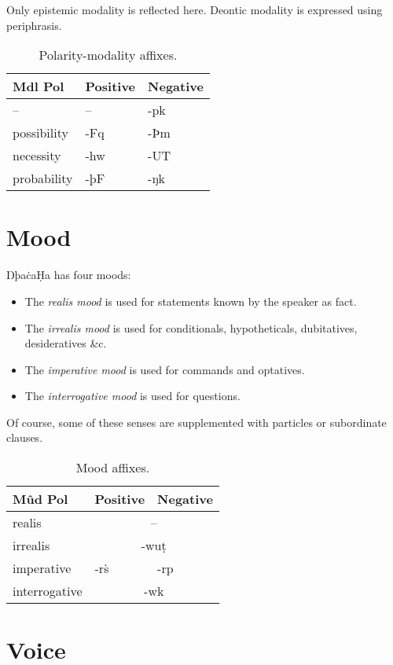 \documentclass{book}
\newcommand{\lname}{ŊþaċaḤa}
\begin{document}
Only epistemic modality is reflected here. Deontic modality is expressed using periphrasis.

\begin{table}[h!]
  \caption{Polarity-modality affixes.}
  \centering
  \begin{tabular}{l|ll}
    Mdl \bs{} Pol & Positive & Negative \\
    \hline
    -- & -- & -pk \\
    possibility & -Fq & -Þm \\
    necessity & -hw & -UT \\
    probability & -þF & -ŋk \\
  \end{tabular}
\end{table}

\section{Mood}

\lname{} has four moods:

\begin{itemize}
  \item The \emph{realis mood} is used for statements known by the speaker as fact.
  \item The \emph{irrealis mood} is used for conditionals, hypotheticals, dubitatives, desideratives \&c.
  \item The \emph{imperative mood} is used for commands and optatives.
  \item The \emph{interrogative mood} is used for questions.
\end{itemize}

Of course, some of these senses are supplemented with particles or subordinate clauses.

\begin{table}[h!]
  \caption{Mood affixes.}
  \centering
  \begin{tabular}{l|ll}
    Mûd \bs{} Pol & Positive & Negative \\
    \hline
    realis & \multicolumn{2}{c}{--} \\
    irrealis & \multicolumn{2}{c}{-wuṭ} \\
    imperative & -rṡ & -rp \\
    interrogative & \multicolumn{2}{c}{-wk} \\
  \end{tabular}
\end{table}

\section{Voice}
\end{document}
